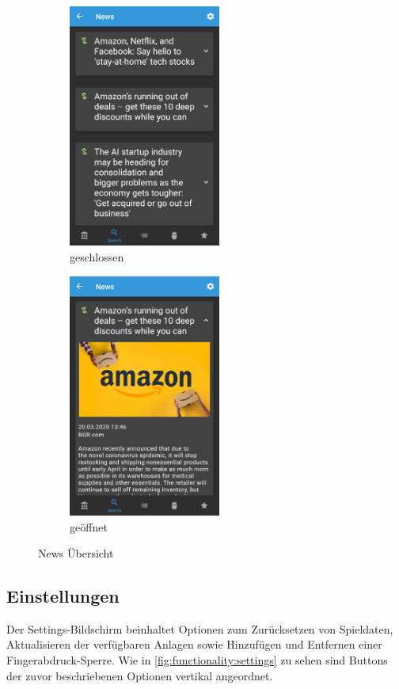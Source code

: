 \documentclass[a4paper]{article}
\begin{document}
\begin{figure}[H]
    \begin{subfigure}{.5\textwidth}
        \centering
        \includegraphics[height=8cm,keepaspectratio]{./images/news/news.png}
        \caption{geschlossen}
        \label{fig:functionality:news:closed}
    \end{subfigure}
    \begin{subfigure}{.5\textwidth}
        \centering
        \includegraphics[height=8cm,keepaspectratio]{./images/news/news_open.png}
        \caption{geöffnet}
        \label{fig:functionality:news:open}
    \end{subfigure}
    \caption{News Übersicht}
    \label{fig:functionality:news}
\end{figure}


\subsection{Einstellungen}
\label{subsec:functionality:settings}
Der Settings-Bildschirm beinhaltet Optionen zum Zurücksetzen von Spieldaten, Aktualisieren der verfügbaren Anlagen sowie Hinzufügen und Entfernen einer Fin\-ger\-abdruck-Sperre.
Wie in \autoref{fig:functionality:settings} zu sehen sind Buttons der zuvor beschriebenen Optionen vertikal angeordnet.
\end{document}

